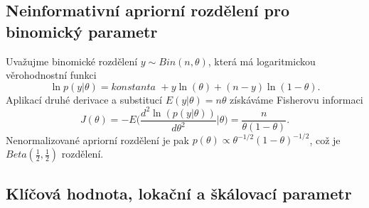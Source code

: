 \subsection{Neinformativní apriorní rozdělení pro binomický parametr}

Uvažujme binomické rozdělení $y \sim \textit{Bin}(n, \theta)$, která má logaritmickou věrohodnostní funkci
\begin{equation}
\ln p(y | \theta) = \textit{konstanta } + y \ln(\theta) + (n - y)\ln(1 - \theta).
\end{equation}
Aplikací druhé derivace a substitucí $E(y | \theta) = n \theta$ získáváme Fisherovu informaci
\begin{equation}
J(\theta) = - E \Big(\frac{d^2 \ln(p(y | \theta))}{d \theta ^ 2} | \theta \Big) = \frac{n}{\theta(1 - \theta)}.
\end{equation}
Nenormalizované apriorní rozdělení je pak $p(\theta) \varpropto \theta^{-1/2}(1 - \theta)^{-1/2}$, což je $\textit{Beta}(\frac{1}{2}, \frac{1}{2})$ rozdělení.

\subsection{Klíčová hodnota, lokační a škálovací parametr}

